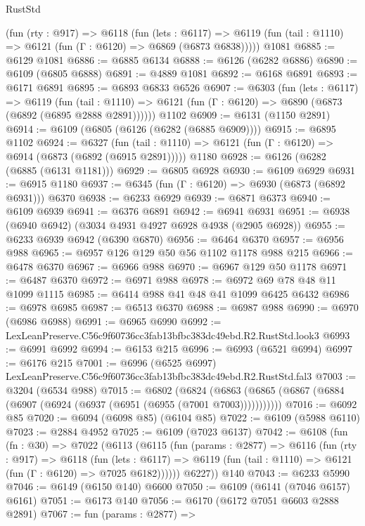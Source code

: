 \begin{lexlean}{RustStd}
\begin{coremodule}
    (fun (rty : @917) =>
    @6118
      (fun (lets : @6117) =>
      @6119 (fun (tail : @1110) => @6121 (fun (Γ : @6120) => @6869 (@6873 @6838)))))
    @1081
@6885 := @6129 @1081
@6886 := @6885 @6134
@6888 := @6126 (@6282 @6886)
@6890 := @6109 (@6805 @6888)
@6891 := @4889 @1081
@6892 := @6168 @6891
@6893 := @6171 @6891
@6895 := @6893 @6833 @6526
@6907 := @6303
    (fun (lets : @6117) =>
    @6119
      (fun (tail : @1110) => @6121 (fun (Γ : @6120) => @6890 (@6873 (@6892 (@6895 @2888 @2891))))))
    @1102
@6909 := @6131 (@1150 @2891)
@6914 := @6109 (@6805 (@6126 (@6282 (@6885 @6909))))
@6915 := @6895 @1102
@6924 := @6327
    (fun (tail : @1110) => @6121 (fun (Γ : @6120) => @6914 (@6873 (@6892 (@6915 @2891)))))
    @1180
@6928 := @6126 (@6282 (@6885 (@6131 @1181)))
@6929 := @6805 @6928
@6930 := @6109 @6929
@6931 := @6915 @1180
@6937 := @6345 (fun (Γ : @6120) => @6930 (@6873 (@6892 @6931))) @6370
@6938 := @6233 @6929
@6939 := @6871 @6373
@6940 := @6109 @6939
@6941 := @6376 @6891
@6942 := @6941 @6931
@6951 := @6938 (@6940 @6942) (@3034 @4931 @4927 @6928 @4938 (@2905 @6928))
@6955 := @6233 @6939 @6942 (@6390 @6870)
@6956 := @6464 @6370
@6957 := @6956 @988
@6965 := @6957 @126 @129 @50 @56 @1102 @1178 @988 @215
@6966 := @6478 @6370
@6967 := @6966 @988
@6970 := @6967 @129 @50 @1178
@6971 := @6487 @6370
@6972 := @6971 @988
@6978 := @6972 @69 @78 @48 @11 @1099 @1115
@6985 := @6414 @988 @41 @48 @41 @1099 @6425 @6432
@6986 := @6978 @6985
@6987 := @6513 @6370
@6988 := @6987 @988
@6990 := @6970 (@6986 @6988)
@6991 := @6965 @6990
@6992 := LexLeanPreserve.C56c9f60736cc3fab13bfbc383dc49ebd.R2.RustStd.look3
@6993 := @6991 @6992
@6994 := @6153 @215
@6996 := @6993 (@6521 @6994)
@6997 := @6176 @215
@7001 := @6996 (@6525 @6997) LexLeanPreserve.C56c9f60736cc3fab13bfbc383dc49ebd.R2.RustStd.fal3
@7003 := @3204 (@6534 @988)
@7015 := @6802
    (@6824 (@6863 (@6865 (@6867 (@6884 (@6907 (@6924 (@6937 (@6951 (@6955 (@7001 @7003)))))))))))
@7016 := @6092 @85
@7020 := @6094 (@6098 @85) (@6104 @85)
@7022 := @6109 (@5988 @6110)
@7023 := @2884 @4952
@7025 := @6109 (@7023 @6137)
@7042 := @6108
    (fun (fn : @30) =>
    @7022
      (@6113
        (@6115
          (fun (params : @2877) =>
          @6116
            (fun (rty : @917) =>
            @6118
              (fun (lets : @6117) =>
              @6119 (fun (tail : @1110) => @6121 (fun (Γ : @6120) => @7025 @6182))))))
        @6227))
    @140
@7043 := @6233 @5990
@7046 := @6149 (@6150 @140) @6600
@7050 := @6109 (@6141 (@7046 @6157) @6161)
@7051 := @6173 @140
@7056 := @6170 (@6172 @7051 @6603 @2888 @2891)
@7067 := fun (params : @2877) =>

\end{coremodule}
\end{lexlean}
